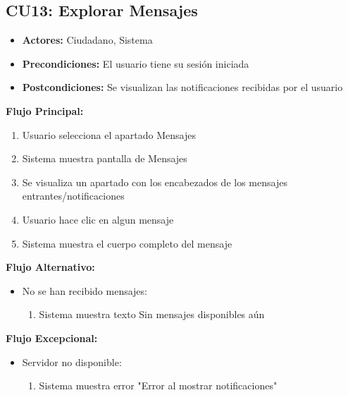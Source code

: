 \begin{multicols}{2}
\subsection*{CU13: Explorar Mensajes}
\begin{itemize}
    \item \textbf{Actores:} Ciudadano, Sistema
    \item \textbf{Precondiciones:} El usuario tiene su sesión iniciada
    \item \textbf{Postcondiciones:} Se visualizan las notificaciones recibidas por el usuario
\end{itemize}
\textbf{Flujo Principal:}
\begin{enumerate}
    \item Usuario selecciona el apartado Mensajes
    \item Sistema muestra pantalla de Mensajes
    \item Se visualiza un apartado con los encabezados de los mensajes entrantes/notificaciones
    \item Usuario hace clic en algun mensaje
    \item Sistema muestra el cuerpo completo del mensaje
\end{enumerate}

\textbf{Flujo Alternativo:}
\begin{itemize}
    \item No se han recibido mensajes:
    \begin{enumerate}
        \item Sistema muestra texto Sin mensajes disponibles aún
    \end{enumerate}
\end{itemize}

\textbf{Flujo Excepcional:}
\begin{itemize}
    \item Servidor no disponible:
    \begin{enumerate}
        \item Sistema muestra error "Error al mostrar notificaciones"
    \end{enumerate}
\end{itemize}


\end{multicols}
